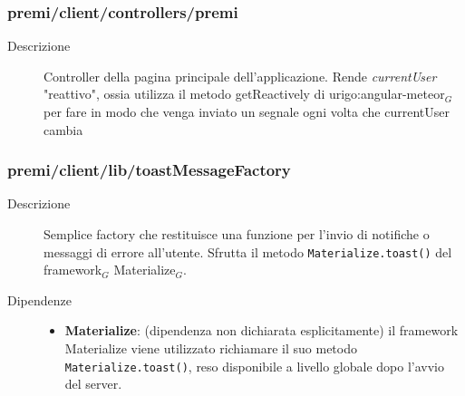 \subsubsection{premi/client/controllers/premi}

\begin{description}
\item[Descrizione] \hfill
	Controller della pagina principale dell'applicazione. Rende \textit{currentUser} "reattivo", ossia utilizza il metodo getReactively di urigo:angular-meteor$_G$ per fare in modo che venga inviato un segnale ogni volta che currentUser cambia
\end{description}

\subsubsection{premi/client/lib/toastMessageFactory}

\begin{description}
\item[Descrizione] \hfill
	Semplice factory che restituisce una funzione per l'invio di notifiche o messaggi di errore all'utente. Sfrutta il metodo \texttt{Materialize.toast()} del framework$_G$ Materialize$_G$.
\item[Dipendenze] \hfill
	\begin{itemize}
		\item \textbf{Materialize}: (dipendenza non dichiarata esplicitamente) il framework Materialize viene utilizzato richiamare il suo metodo \texttt{Materialize.toast()}, reso disponibile a livello globale dopo l'avvio del server.
	\end{itemize}
\end{description}

